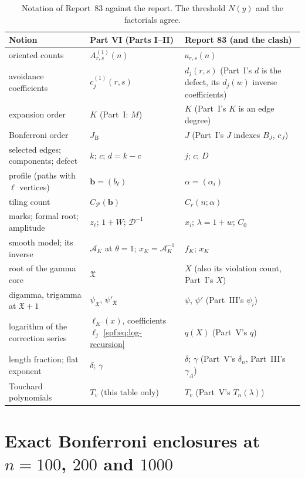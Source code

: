 \documentclass[11pt]{article}
\numberwithin{equation}{section}
\theoremstyle{definition}
\theoremstyle{remark}
\theoremstyle{definition}
\begin{document}
\begin{table}[htbp]
\centering\small
\renewcommand{\arraystretch}{1.12}
\begin{tabular}{@{}>{\raggedright\arraybackslash}p{}>{\raggedright\arraybackslash}p{}>{\raggedright\arraybackslash}p{}@{}}
\toprule
Notion & Part VI (Parts I--II) & Report 83 (and the clash)\\
\midrule
oriented counts & $A^{(1)}_{r,s}(n)$ & $a_{r,s}(n)$\\
avoidance coefficients & $c_j^{(1)}(r,s)$ & $d_j(r,s)$ (Part~I's $d$ is the defect, its $d_j(w)$ inverse coefficients)\\
expansion order & $K$ (Part~I: $M$) & $K$ (Part~I's $K$ is an edge degree)\\
Bonferroni order & $J_{\mathrm B}$ & $J$ (Part~I's $J$ indexes $B_J$, $c_J$)\\
selected edges; components; defect & $k$; $c$; $d=k-c$ & $j$; $c$; $D$\\
profile (paths with $\ell$ vertices) & $\mathbf b=(b_\ell)$ & $\alpha=(\alpha_i)$\\
tiling count & $C_{\mathcal P}(\mathbf b)$ & $C_r(n;\alpha)$\\
marks; formal root; amplitude & $z_\ell$; $1+W$; $\mathcal D^{-1}$ & $x_i$; $\lambda=1+w$; $C_0$\\
smooth model; its inverse & $\mathcal A_K$ at $\theta=1$; $x_K=\mathcal A_K^{-1}$ & $f_K$; $x_K$\\
root of the gamma core & $\mathfrak X$ & $X$ (also its violation count, Part~I's $X$)\\
digamma, trigamma at $\mathfrak X+1$ & $\psi_{\mathfrak X}$, $\psi'_{\mathfrak X}$ & $\psi$, $\psi'$ (Part~III's $\psi_i$)\\
logarithm of the correction series & $\ell_K(x)$, coefficients $\ell_j$ \eqref{spf:eq:log-recursion} & $q(X)$ (Part~V's $q$)\\
length fraction; flat exponent & $\delta$; $\gamma$ & $\delta$; $\gamma$ (Part~V's $\delta_n$, Part~III's $\gamma_A$)\\
Touchard polynomials & $T_v$ (this table only) & $T_v$ (Part~V's $T_n(\lambda)$)\\
\bottomrule
\end{tabular}
\caption{Notation of Report~83 against the report. The threshold $N(y)$ and
the factorials agree.}
\label{spf:fd:tab:dictionary}
\end{table}

\section{Exact Bonferroni enclosures at \texorpdfstring{$n=100$, $200$ and $1000$}{n = 100, 200 and 1000}}
\label{spf:fd:sec:bonferroni}
\end{document}
